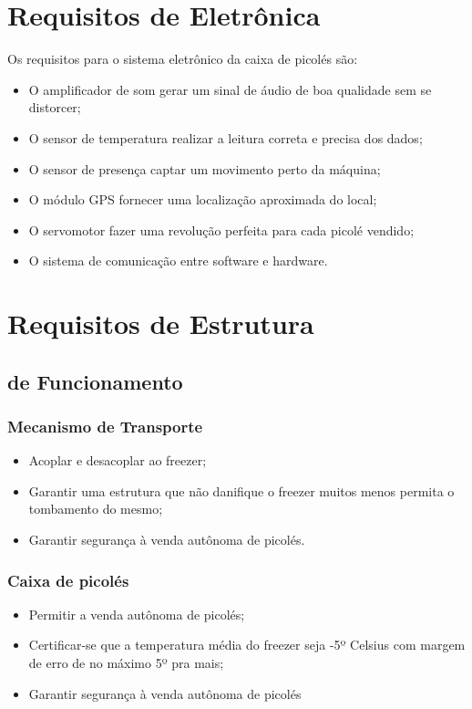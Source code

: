 \section{Requisitos de Eletrônica}

Os requisitos para o sistema eletrônico da caixa de picolés são:

\begin{itemize}
	\item O amplificador de som gerar um sinal de áudio de boa qualidade sem se distorcer;
    \item O sensor de temperatura realizar a leitura correta e precisa dos dados;
    \item O sensor de presença captar um movimento perto da máquina;
    \item O módulo GPS fornecer uma localização aproximada do local;
    \item O servomotor fazer uma revolução perfeita para cada picolé vendido;
    \item O sistema de comunicação entre software e hardware.
\end{itemize}

\section{Requisitos de Estrutura}

\subsection{de Funcionamento}

\subsubsection{Mecanismo de Transporte}
\begin{itemize}
\item Acoplar e desacoplar ao freezer;
\item Garantir uma estrutura que não danifique o freezer muitos menos permita o tombamento do mesmo;
\item Garantir segurança à venda autônoma de picolés.
\end{itemize}
\subsubsection{Caixa de picolés}
\begin{itemize}
\item Permitir a venda autônoma de picolés;
\item Certificar-se que a temperatura média do freezer seja -5º Celsius com margem de erro de no máximo 5º pra mais;
\item Garantir segurança à venda autônoma de picolés
\end{itemize}

